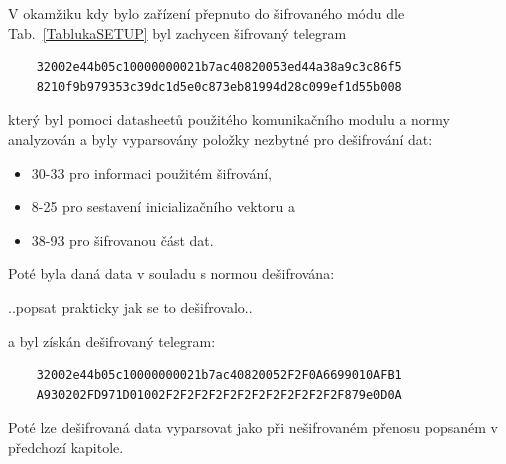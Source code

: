 V okamžiku kdy bylo zařízení přepnuto do šifrovaného módu dle Tab.~\ref{TablukaSETUP} byl zachycen šifrovaný telegram

\begin{verbatim}
	32002e44b05c10000000021b7ac40820053ed44a38a9c3c86f5
	8210f9b979353c39dc1d5e0c873eb81994d28c099ef1d55b008
\end{verbatim}

který byl pomoci datasheetů použitého komunikačního modulu \cite{ModulIQRF} a normy~\cite{Norma1,NormaFIPS} analyzován a byly vyparsovány položky nezbytné pro dešifrování dat:
\begin{itemize}
	\item 30-33 pro informaci použitém šifrování,
	\item 8-25 pro sestavení inicializačního vektoru a
	\item 38-93 pro šifrovanou část dat.
\end{itemize}

Poté byla daná data v souladu s normou \cite{NormaFIPS} dešifrována:


..\colorbox[rgb]{1,0,0}{popsat prakticky jak se to dešifrovalo}..


 a byl získán dešifrovaný telegram:

\begin{verbatim}
	32002e44b05c10000000021b7ac40820052F2F0A6699010AFB1
	A930202FD971D01002F2F2F2F2F2F2F2F2F2F2F2F2F879e0D0A
\end{verbatim}

Poté lze dešifrovaná data vyparsovat jako při nešifrovaném přenosu popsaném v předchozí kapitole.

